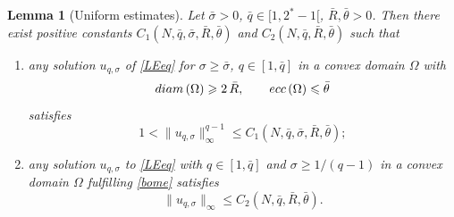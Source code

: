 \documentclass[12pt]{amsart}
\numberwithin{equation}{section}
\theoremstyle{plain}
\newtheorem{lemma}[theorem]{Lemma}
\theoremstyle{plain}
\theoremstyle{plain}
\theoremstyle{definition}
\newcommand{\beq}{\begin{equation}}
\newcommand{\eeq}{\end{equation}}
\renewcommand{\le}{\leqslant}
\renewcommand{\ge}{\geqslant}
\begin{document}
\begin{lemma}[Uniform estimates]
\label{lem_apriori_est}
Let $\bar\sigma>0$, $\bar q\in [1, 2^*-1[$, $\bar R, \bar\theta>0$. 
Then there exist positive constants $C_1(N, \bar q, \bar \sigma, \bar R, \bar \theta)$ and $C_2(N, \bar q, \bar R, \bar\theta)$ such that
\begin{enumerate}
\item
any solution $u_{q, \sigma}$ of \eqref{LEeq} for $\sigma\ge\bar\sigma$, $q\in [1, \bar q]$ in a convex domain $\Omega$ with 
\beq
\label{bome}
{\rm diam}\,(\Omega)\ge 2\, \bar R, \qquad {\rm ecc}\, (\Omega)\le \bar\theta
\eeq
satisfies 
\beq
\label{ape1}
1<\|u_{q, \sigma}\|_\infty^{q-1}\le C_1(N, \bar q, \bar \sigma, \bar R, \bar \theta);
\eeq
\item
 any solution $u_{q, \sigma}$ to \eqref{LEeq} with $q\in [1, \bar q]$ and $\sigma\ge 1/(q-1)$ in a convex domain $\Omega$ fulfilling \eqref{bome} satisfies 
\beq
\label{ape2}
 \|u_{q, \sigma}\|_\infty \le C_2(N, \bar q,\bar R, \bar \theta).
\eeq
\end{enumerate}
\end{lemma}
\end{document}
